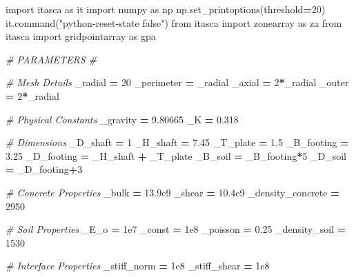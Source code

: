 \documentclass[a4paper, nobind]{templates/ociamthesis}
\newenvironment{Shaded}{\begin{snugshade}}{\end{snugshade}}
\newcommand{\CommentTok}[1]{\textcolor[rgb]{0.56,0.35,0.01}{\textit{#1}}}
\newcommand{\DecValTok}[1]{\textcolor[rgb]{0.00,0.00,0.81}{#1}}
\newcommand{\FloatTok}[1]{\textcolor[rgb]{0.00,0.00,0.81}{#1}}
\newcommand{\ImportTok}[1]{#1}
\newcommand{\NormalTok}[1]{#1}
\newcommand{\OperatorTok}[1]{\textcolor[rgb]{0.81,0.36,0.00}{\textbf{#1}}}
\newcommand{\StringTok}[1]{\textcolor[rgb]{0.31,0.60,0.02}{#1}}
\renewenvironment{Shaded}
{
  \vspace{10pt}%
  \begin{snugshade}%
}{%
  \end{snugshade}%
  \vspace{8pt}%
}
\begin{document}
\begin{Shaded}
\begin{Highlighting}[]
\ImportTok{import}\NormalTok{ itasca }\ImportTok{as}\NormalTok{ it}
\ImportTok{import}\NormalTok{ numpy }\ImportTok{as}\NormalTok{ np}
\NormalTok{np.set\_printoptions(threshold}\OperatorTok{=}\DecValTok{20}\NormalTok{)}
\NormalTok{it.command(}\StringTok{"python{-}reset{-}state false"}\NormalTok{)}
\ImportTok{from}\NormalTok{ itasca }\ImportTok{import}\NormalTok{ zonearray }\ImportTok{as}\NormalTok{ za}
\ImportTok{from}\NormalTok{ itasca }\ImportTok{import}\NormalTok{ gridpointarray }\ImportTok{as}\NormalTok{ gpa}

\CommentTok{\# PARAMETERS \#}

\CommentTok{\# Mesh Details}
\NormalTok{\_radial }\OperatorTok{=} \DecValTok{20}
\NormalTok{\_perimeter }\OperatorTok{=}\NormalTok{ \_radial}
\NormalTok{\_axial }\OperatorTok{=} \DecValTok{2}\OperatorTok{*}\NormalTok{\_radial}
\NormalTok{\_outer }\OperatorTok{=} \DecValTok{2}\OperatorTok{*}\NormalTok{\_radial}

\CommentTok{\# Physical Constants}
\NormalTok{\_gravity }\OperatorTok{=} \FloatTok{9.80665}
\NormalTok{\_K }\OperatorTok{=} \FloatTok{0.318}

\CommentTok{\# Dimensions}
\NormalTok{\_D\_shaft }\OperatorTok{=} \DecValTok{1}
\NormalTok{\_H\_shaft }\OperatorTok{=} \FloatTok{7.45}
\NormalTok{\_T\_plate }\OperatorTok{=} \FloatTok{1.5}
\NormalTok{\_B\_footing }\OperatorTok{=} \FloatTok{3.25}
\NormalTok{\_D\_footing }\OperatorTok{=}\NormalTok{ \_H\_shaft }\OperatorTok{+}\NormalTok{ \_T\_plate}
\NormalTok{\_B\_soil }\OperatorTok{=}\NormalTok{ \_B\_footing}\OperatorTok{*}\DecValTok{5}
\NormalTok{\_D\_soil }\OperatorTok{=}\NormalTok{ \_D\_footing}\OperatorTok{+}\DecValTok{3}

\CommentTok{\# Concrete Properties}
\NormalTok{\_bulk }\OperatorTok{=} \FloatTok{13.9e9}
\NormalTok{\_shear }\OperatorTok{=} \FloatTok{10.4e9}
\NormalTok{\_density\_concrete }\OperatorTok{=} \DecValTok{2950}

\CommentTok{\# Soil Properties}
\NormalTok{\_E\_o }\OperatorTok{=} \FloatTok{1e7}
\NormalTok{\_const }\OperatorTok{=} \FloatTok{1e8}
\NormalTok{\_poisson }\OperatorTok{=} \FloatTok{0.25}
\NormalTok{\_density\_soil }\OperatorTok{=} \DecValTok{1530}

\CommentTok{\# Interface Properties}
\NormalTok{\_stiff\_norm }\OperatorTok{=} \FloatTok{1e8}
\NormalTok{\_stiff\_shear }\OperatorTok{=} \FloatTok{1e8}
\end{Highlighting}
\end{Shaded}
\end{document}
